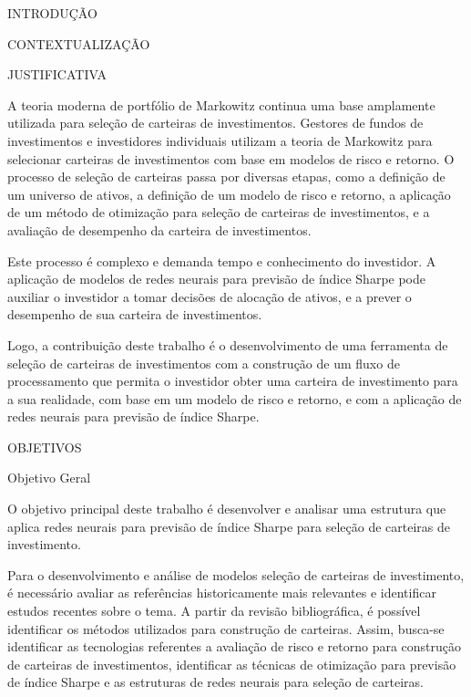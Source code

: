 \begin{section}{INTRODUÇÃO}
\begin{subsection}{CONTEXTUALIZAÇÃO}
    \end{subsection}

    \begin{subsection}{JUSTIFICATIVA}
        
        \ipar A teoria moderna de portfólio de Markowitz continua uma base amplamente utilizada para seleção de carteiras de investimentos. Gestores de fundos de investimentos e investidores individuais utilizam a teoria de Markowitz para selecionar carteiras de investimentos com base em modelos de risco e retorno. O processo de seleção de carteiras passa por diversas etapas, como a definição de um universo de ativos, a definição de um modelo de risco e retorno, a aplicação de um método de otimização para seleção de carteiras de investimentos, e a avaliação de desempenho da carteira de investimentos.

        \ipar Este processo é complexo e demanda tempo e conhecimento do investidor. A aplicação de modelos de redes neurais para previsão de índice Sharpe pode auxiliar o investidor a tomar decisões de alocação de ativos, e a prever o desempenho de sua carteira de investimentos. 

        \ipar Logo, a contribuição deste trabalho é o desenvolvimento de uma ferramenta de seleção de carteiras de investimentos com a construção de um fluxo de processamento que permita o investidor obter uma carteira de investimento para a sua realidade, com base em um modelo de risco e retorno, e com a aplicação de redes neurais para previsão de índice Sharpe. 

    \end{subsection}

    \begin{subsection}{OBJETIVOS}

        \begin{subsubsection}{Objetivo Geral}

            \ipar O objetivo principal deste trabalho é desenvolver e analisar uma estrutura que aplica redes neurais para previsão de índice Sharpe para seleção de carteiras de investimento.

            \ipar Para o desenvolvimento e análise de modelos seleção de carteiras de investimento, é necessário avaliar as referências historicamente mais relevantes e identificar estudos recentes sobre o tema. A partir da revisão bibliográfica, é possível identificar os métodos utilizados para construção de carteiras. Assim, busca-se identificar as tecnologias referentes a avaliação de risco e retorno para construção de carteiras de investimentos, identificar as técnicas de otimização para previsão de índice Sharpe e as estruturas de redes neurais para seleção de carteiras.


\end{subsubsection}
\end{subsection}
\end{section}
